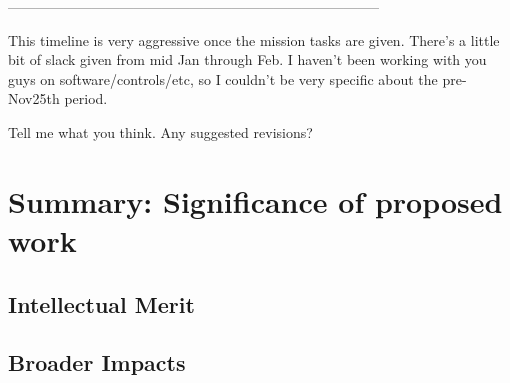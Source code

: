 \documentclass{proposalnsf}
\begin{document}
--------------------------------------------------------------------------------

This timeline is very aggressive once the mission tasks are given.
There's a little bit of slack given from mid Jan through Feb. I
haven't been working with you guys on software/controls/etc, so I
couldn't be very specific about the pre-Nov25th period.

Tell me what you think. Any suggested revisions?

\section{Summary:  Significance of proposed work}

\subsection{Intellectual Merit}

\subsection{Broader Impacts}



\newpage
{}
\renewcommand{\thepage} {E--\arabic{page}}




\newpage
{}
\renewcommand{\thepage} {G--\arabic{page}}
\end{document}
